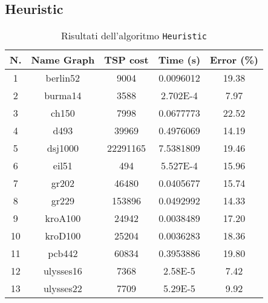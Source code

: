 \subsection{Heuristic}

\begin{table}[H]
	\centering
	\begin{tabular}{|c|c|c|c|c|}
		\hline
		\textbf{N.} & \textbf{Name Graph} & \textbf{TSP cost} & \textbf{Time (s)} & \textbf{Error (\%)}\\ 
		\hline
		1 & berlin52 & 9004 & 0.0096012 & 19.38
		\\
		\hline
		2 & burma14 & 3588 & 2.702E-4 & 7.97
		\\
		\hline
		3 & ch150 & 7998 & 0.0677773 & 22.52
		\\
		\hline
		4 & d493 & 39969 & 0.4976069 & 14.19
		\\
		\hline
		5 & dsj1000 & 22291165 & 7.5381809 & 19.46
		\\
		\hline
		6 & eil51 & 494 & 5.527E-4 & 15.96
		\\
		\hline
		7 & gr202 & 46480 & 0.0405677 & 15.74
		\\
		\hline
		8 & gr229 & 153896 & 0.0492992 & 14.33
		\\
		\hline
		9 & kroA100 & 24942 & 0.0038489 & 17.20
		\\
		\hline
		10 & kroD100 & 25204 & 0.0036283 & 18.36
		\\
		\hline
		11 & pcb442 & 60834 & 0.3953886 & 19.80
		\\
		\hline
		12 & ulysses16 & 7368 & 2.58E-5 & 7.42
		\\
		\hline
		13 & ulysses22 & 7709 & 5.29E-5 & 9.92
		\\
		\hline
	\end{tabular}
	\caption{Risultati dell'algoritmo \texttt{Heuristic}}
\end{table}